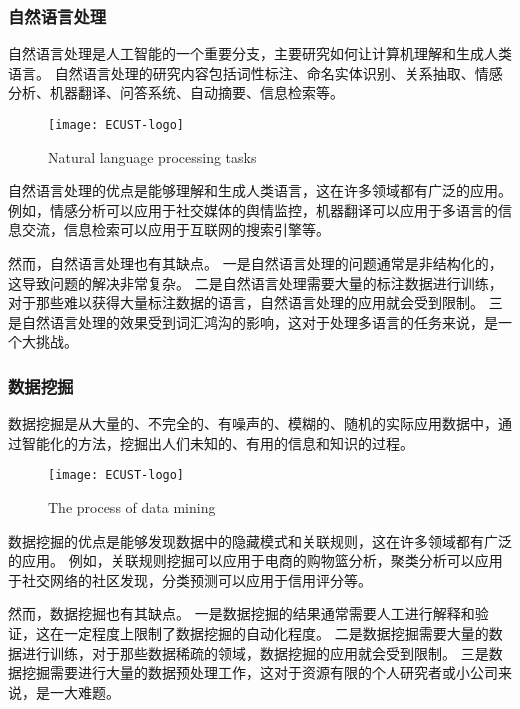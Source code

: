 \subsubsection{自然语言处理}\label{subsubsec:nlp}
自然语言处理是人工智能的一个重要分支，主要研究如何让计算机理解和生成人类语言。
自然语言处理的研究内容包括词性标注、命名实体识别、关系抽取、情感分析、机器翻译、问答系统、自动摘要、信息检索等。\par
\begin{figure}[ht]
    \centering
    \texttt{[image: ECUST-logo]}
    \caption{Natural language processing tasks}
    \label{fig:nlp-tasks}
\end{figure}

自然语言处理的优点是能够理解和生成人类语言，这在许多领域都有广泛的应用。
例如，情感分析可以应用于社交媒体的舆情监控，机器翻译可以应用于多语言的信息交流，信息检索可以应用于互联网的搜索引擎等。\par
然而，自然语言处理也有其缺点。
一是自然语言处理的问题通常是非结构化的，这导致问题的解决非常复杂。
二是自然语言处理需要大量的标注数据进行训练，对于那些难以获得大量标注数据的语言，自然语言处理的应用就会受到限制。
三是自然语言处理的效果受到词汇鸿沟的影响，这对于处理多语言的任务来说，是一个大挑战。\par

\subsubsection{数据挖掘}\label{subsubsec:data-mining}
数据挖掘是从大量的、不完全的、有噪声的、模糊的、随机的实际应用数据中，通过智能化的方法，挖掘出人们未知的、有用的信息和知识的过程。\par
\begin{figure}[ht]
    \centering
    \texttt{[image: ECUST-logo]}
    \caption{The process of data mining}
    \label{fig:data-mining}
\end{figure}

数据挖掘的优点是能够发现数据中的隐藏模式和关联规则，这在许多领域都有广泛的应用。
例如，关联规则挖掘可以应用于电商的购物篮分析，聚类分析可以应用于社交网络的社区发现，分类预测可以应用于信用评分等。\par
然而，数据挖掘也有其缺点。
一是数据挖掘的结果通常需要人工进行解释和验证，这在一定程度上限制了数据挖掘的自动化程度。
二是数据挖掘需要大量的数据进行训练，对于那些数据稀疏的领域，数据挖掘的应用就会受到限制。
三是数据挖掘需要进行大量的数据预处理工作，这对于资源有限的个人研究者或小公司来说，是一大难题。\par

